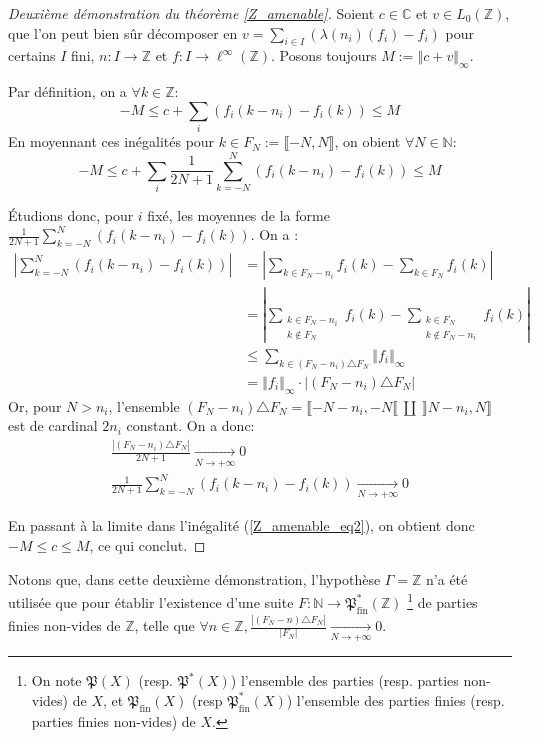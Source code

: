 \documentclass[a4paper,12pt]{article}
\newcommand{\N}{\mathbb{N}}
\newcommand{\Z}{\mathbb{Z}}
\newcommand{\C}{\mathbb{C}}
\newcommand{\norm}[1]{\left\Vert #1\right\Vert}
\newcommand{\abs}[1]{\left\vert#1\right\vert}
\newcommand{\card}[1]{\abs{#1}}
\newcommand{\parts}{\mathfrak{P}}
\newcommand{\finparts}{\mathfrak{P}_{\mathrm{fin}}}
\begin{document}
\begin{proof}[Deuxième démonstration du théorème \ref{Z_amenable}]
    Soient $c\in\C$ et $v\in L_0(\Z)$, que l'on peut bien sûr décomposer en $v = \sum_{i\in I} (\lambda(n_i)(f_i) - f_i)$ pour certains $I$ fini, $n : I \to\Z$ et
    $f : I\to\ell^\infty(\Z)$. Posons toujours $M := \norm{c + v}_\infty$.

    Par définition, on a $\forall k\in\Z$:
    \begin{equation*}
        -M \le c + \sum_i (f_i(k-n_i) - f_i(k)) \le M
    \end{equation*}
    En moyennant ces inégalités pour $k\in F_N := \llbracket-N,N\rrbracket$, on obient $\forall N\in\N$:
    \begin{equation}\label{Z_amenable_eq2}
        -M \le c + \sum_i \frac1{2N+1} \sum_{k=-N}^N (f_i(k-n_i) - f_i(k)) \le M
    \end{equation}

    Étudions donc, pour $i$ fixé, les moyennes de la forme $\frac1{2N+1} \sum_{k=-N}^N (f_i(k-n_i) - f_i(k))$. On a :
    \begin{align*}
        \abs{\sum_{k=-N}^N (f_i(k-n_i) - f_i(k))} &= \abs{\sum_{k\in F_N - n_i} f_i(k) - \sum_{k\in F_N}f_i(k)} \\
            &= \abs{\sum_{\substack{k\in F_N - n_i \\ k\notin F_N}} f_i(k) -
            \sum_{\substack{k\in F_N \\ k\notin F_N-n_i}} f_i(k)} \\
            &\le \sum_{k\in (F_N-n_i)\triangle F_N} \norm{f_i}_\infty \\
            &=\norm{f_i}_\infty \cdot \card{(F_N-n_i)\triangle F_N}
    \end{align*}
    Or, pour $N>n_i$, l'ensemble $(F_N-n_i)\triangle F_N = \llbracket -N-n_i, -N\llbracket\ \amalg\ \rrbracket N-n_i, N\rrbracket$ est de cardinal $2n_i$ constant.
    On a donc:
    \begin{gather*}
        \frac{\card{(F_N-n_i)\triangle F_N}}{2N+1} \xrightarrow[N\to+\infty]{} 0 \\
        \frac1{2N+1} \sum_{k=-N}^N (f_i(k-n_i) - f_i(k)) \xrightarrow[N\to+\infty]{} 0
    \end{gather*}

    En passant à la limite dans l'inégalité (\ref{Z_amenable_eq2}), on obtient donc $-M\le c\le M$, ce qui conclut.
\end{proof}

Notons que, dans cette deuxième démonstration, l'hypothèse $\Gamma=\Z$ n'a été utilisée que pour établir l'existence d'une suite $F:\N\to\finparts^*(\Z)$ 
    \footnote{On note $\parts(X)$ (resp. $\parts^*(X)$) l'ensemble des parties (resp. parties non-vides) de $X$, et $\finparts(X)$ (resp $\finparts^*(X)$) 
    l'ensemble des parties finies (resp. parties finies non-vides) de $X$.}
de parties finies non-vides de $\Z$,
telle que $\forall n\in\Z, \frac{\card{(F_N-n)\triangle F_N}}{\card{F_N}} \xrightarrow[N\to+\infty]{} 0$. 
\end{document}
